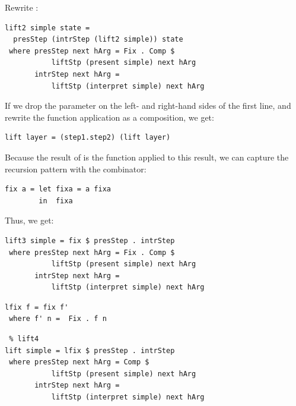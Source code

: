 \documentclass[preprint,natbib]{sigplanconf}
\begin{document}
Rewrite :

\begin{small} %
\begin{verbatim}
lift2 simple state =
  presStep (intrStep (lift2 simple)) state
 where presStep next hArg = Fix . Comp $
           liftStp (present simple) next hArg
       intrStep next hArg =
           liftStp (interpret simple) next hArg
\end{verbatim}%
\end{small}



If we drop the  parameter on the left- and right-hand sides of the first line, and rewrite the function application as a composition, we get:
\
\begin{small}
\begin{verbatim}
lift layer = (step1.step2) (lift layer)
\end{verbatim}
\end{small}

Because the result of  is the function  applied to this result, we can capture the recursion pattern with  the  combinator:

\begin{small}
\begin{verbatim}
fix a = let fixa = a fixa
        in  fixa
\end{verbatim}
\end{small}

Thus, we get:

\begin{small} %
\begin{verbatim}
lift3 simple = fix $ presStep . intrStep
 where presStep next hArg = Fix . Comp $
           liftStp (present simple) next hArg
       intrStep next hArg = 
           liftStp (interpret simple) next hArg
\end{verbatim}
\end{small}


\begin{small}
\begin{verbatim}
lfix f = fix f' 
 where f' n =  Fix . f n
\end{verbatim}
\end{small}

\begin{small}
\begin{verbatim} % lift4
lift simple = lfix $ presStep . intrStep
 where presStep next hArg = Comp $
           liftStp (present simple) next hArg
       intrStep next hArg = 
           liftStp (interpret simple) next hArg
\end{verbatim}
\end{small}
\end{document}
